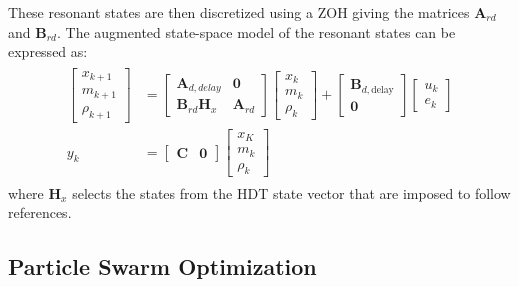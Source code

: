 These resonant states are then discretized using a ZOH giving the matrices $\mathbf{A}_{rd}$ and $\mathbf{B}_{rd}$. The augmented state-space model of the resonant states can be expressed as:
\begin{align}
    \begin{aligned}
        \begin{bmatrix}
            x_{k + 1}\\
            m_{k + 1}\\
            \rho_{k + 1}
        \end{bmatrix}
        &=
        \begin{bmatrix}
            \mathbf{A}_{d,delay} & \mathbf{0} \\
            \mathbf{B}_{rd}\mathbf{H}_x & \mathbf{A}_{rd}
        \end{bmatrix}
        \begin{bmatrix}
            x_k\\
            m_k\\
            \rho_k
        \end{bmatrix}
        +
        \begin{bmatrix}
            \mathbf{B}_{d,\text{delay}}\\
            \mathbf{0}
        \end{bmatrix}
        \begin{bmatrix}
            u_k\\
            e_k
        \end{bmatrix}
        \\
        y_k &= 
        \begin{bmatrix}
            \mathbf{C} & \mathbf{0}
        \end{bmatrix}
        \begin{bmatrix}
            x_K\\
            m_k\\
            \rho_k
        \end{bmatrix}
    \end{aligned}
\end{align}
where $\mathbf{H}_x$ selects the states from the HDT state vector that are imposed to follow references.

\subsection{Particle Swarm Optimization}

